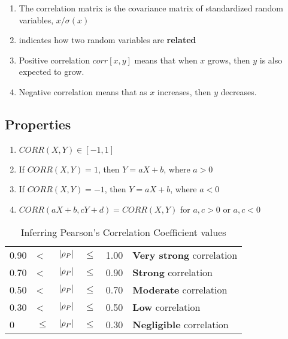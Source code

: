 \begin{enumerate}
    \item The correlation matrix is the covariance matrix of standardized random variables, $x/\sigma(x)$

    \item indicates how two random variables are \textbf{related}

    \item Positive correlation $corr[x, y]$ means that when $x$ grows, then $y$ is also expected to grow. 

    \item Negative correlation means that as $x$ increases, then $y$ decreases.

\end{enumerate}

\subsection*{Properties \cite{ism-1}}

\begin{enumerate}
    \item $CORR(X, Y) \in [-1, 1]$

    \item If $CORR(X, Y) = 1$, then $Y = aX + b$, where $a > 0$

    \item If $CORR(X, Y) = -1$, then $Y = aX + b$, where $a < 0$

    \item $CORR(aX + b, cY + d) = CORR(X, Y)$  for $a, c > 0$ or $a, c < 0$

    
\end{enumerate}

\begin{customTableWrapper}{1}
\begin{table}[H]
    \centering
    \begin{tabular}{l l l l l l} 
        0.90 & < & $\left| \rho_P \right|$ & $\leq$ & 1.00 & \textbf{Very strong} correlation\\
        0.70 & < & $\left| \rho_P \right|$ & $\leq$ & 0.90  & \textbf{Strong} correlation\\
        0.50 & < & $\left| \rho_P \right|$ & $\leq$ & 0.70 &  \textbf{Moderate} correlation\\
        0.30 & < & $\left| \rho_P \right|$ & $\leq$ & 0.50  & \textbf{Low} correlation\\
        0  &  $\leq$ & $\left| \rho_P \right|$ & $\leq$ & 0.30 &  \textbf{Negligible} correlation\\
    \end{tabular}
    \caption{Inferring Pearson’s Correlation Coefficient values \cite{ism-1}}
\end{table}
\end{customTableWrapper}


